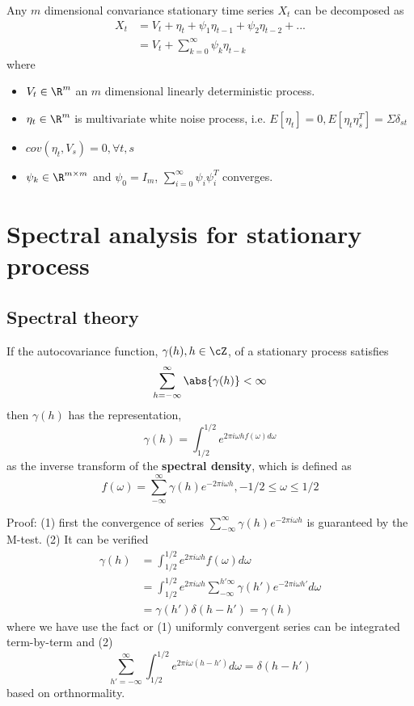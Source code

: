 \begin{theorem}\label{ch:time-series-analysis:th:wolddecompositionmultiD}
Any $m$ dimensional convariance stationary time series $X_t$ can be decomposed as
\begin{align*}
X_t &= V_t + \eta_t + \psi_1 \eta_{t-1} + \psi_2 \eta_{t-2} + ... \\
& = V_t + \sum_{k=0}^\infty \psi_k \eta_{t-k}
\end{align*} 
where
\begin{itemize}
\item $V_t \in \R^m$ an $m$ dimensional linearly deterministic process.
\item $\eta_t \in \R^m$ is multivariate white noise process, i.e. $E[\eta_t] = 0, E[\eta_t\eta_s^T] = \Sigma \delta_{st}$
\item $cov(\eta_t,V_s) = 0,\forall t,s$
\item $\psi_k \in \R^{m\times m}$ and $\psi_0 = I_m$, $\sum_{i=0}^\infty \psi_i\psi_i^T $ converges.
\end{itemize}
\end{theorem}

\section{Spectral analysis for stationary process}
\subsection{Spectral theory}
\begin{theorem}
\cite[181]{shumway2010time} If the autocovariance function, $\gamma(h),h\in \cZ$, of a stationary process satisfies 
$$\sum_{h=-\infty}^{\infty} \abs{\gamma(h)} < \infty$$
then $\gamma(h)$ has the representation, 
$$\gamma(h) = \int_{1/2}^{1/2}e^{2\pi i \omega h f(\omega) d\omega}$$
as the inverse transform of the \textbf{spectral density}, which is defined as
$$f(\omega) = \sum_{-\infty}^{\infty} \gamma(h)e^{-2\pi i \omega h}, -1/2 \leq \omega \leq 1/2$$
\end{theorem}
Proof: (1) first the convergence of series $\sum_{-\infty}^{\infty} \gamma(h)e^{-2\pi i \omega h}$ is guaranteed by the M-test. (2) It can be verified
\begin{align*}
    \gamma(h) &= \int_{1/2}^{1/2}e^{2\pi i \omega h} f(\omega) d\omega\\
        &= \int_{1/2}^{1/2}e^{2\pi i \omega h}  \sum_{-\infty}^{h'\infty} \gamma(h')e^{-2\pi i \omega h'}d\omega \\
        &=\gamma(h')\delta(h-h')=\gamma(h)
\end{align*}
where we have use the fact or (1) uniformly convergent series can be integrated term-by-term and (2) $$\sum_{h'=-\infty}^{\infty}\int_{1/2}^{1/2}e^{2\pi i \omega (h-h')}  d\omega =\delta(h-h')$$ based on orthnormality.


